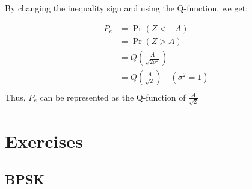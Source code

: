 \documentclass[12pt]{book}
\providecommand{\pr}[1]{\ensuremath{\Pr\left(#1\right)}}
\providecommand{\brak}[1]{\ensuremath{\left(#1\right)}}
\begin{document}
\begin{enumerate}
By changing the inequality sign and using the Q-function, we get:

\begin{align*}
P_e& = \pr{Z < -A} \\
&= \pr{Z > A} \\
&= Q(\frac{A}{\sqrt{2\sigma^2}}) \\
&= Q(\frac{A}{\sqrt{2}})    \quad\brak{\sigma^2 = 1}\\
\end{align*}
Thus, $P_e$ can be represented as the Q-function of $\frac{A}{\sqrt{2}}$
\end{enumerate}
\chapter{Exercises}
\section{BPSK}
\end{document}
